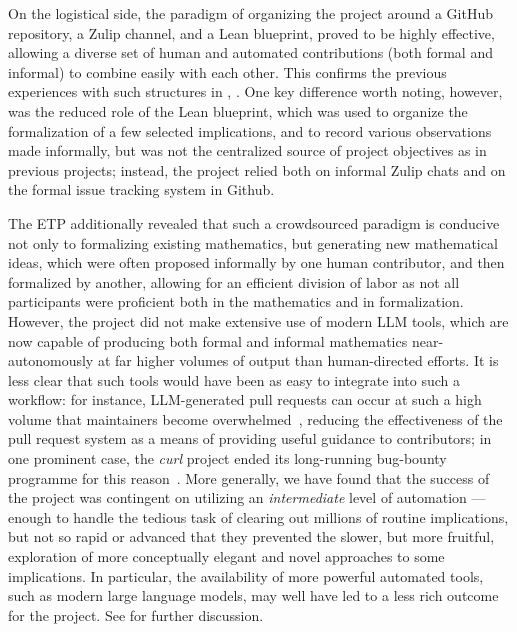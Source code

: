 On the logistical side, the paradigm of organizing the project around a GitHub repository, a Zulip channel, and a Lean blueprint, proved to be highly effective, allowing a diverse set of human and automated contributions (both formal and informal) to combine easily with each other.  This confirms the previous experiences with such structures in \cite{LTE_Scholze_2022, lean_liquid}, \cite{PFR_Tao_Dilles_2023}.  One key difference worth noting, however, was the reduced role of the Lean blueprint, which was used to organize the formalization of a few selected implications, and to record various observations made informally, but was not the centralized source of project objectives as in previous projects; instead, the project relied both on informal Zulip chats and on the formal issue tracking system in Github.

The ETP additionally revealed that such a crowdsourced paradigm is conducive not only to formalizing existing mathematics, but generating new mathematical ideas, which were often proposed informally by one human contributor, and then formalized by another, allowing for an efficient division of labor as not all participants were proficient both in the mathematics and in formalization.  However, the project did not make extensive use of modern LLM tools, which are now capable of producing both formal and informal mathematics near-autonomously at far higher volumes of output than human-directed efforts.  It is less clear that such tools would have been as easy to integrate into such a workflow: for instance, LLM-generated pull requests can occur at such a high volume that maintainers become overwhelmed~\cite{ai_slop_oss}, reducing the effectiveness of the pull request system as a means of providing useful guidance to contributors; in one prominent case, the \emph{curl} project ended its long-running bug-bounty programme for this reason~\cite{curl_bugbounty}.
More generally, we have found that the success of the project was contingent on utilizing an \emph{intermediate} level of automation --- enough to handle the tedious task of clearing out millions of routine implications, but not so rapid or advanced that they prevented the slower, but more fruitful, exploration of more conceptually elegant and novel approaches to some implications.  In particular, the availability of more powerful automated tools, such as modern large language models, may well have led to a less rich outcome for the project.  See  for further discussion.

